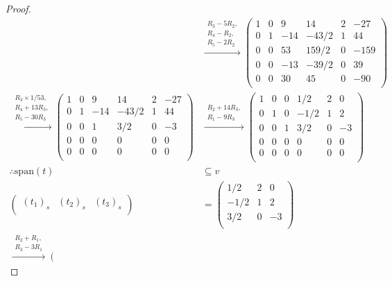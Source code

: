 \documentclass[12pt]{article}
\begin{document}
\begin{proof}
\begin{align*}
&\xrightarrow{\substack{R_3 - 5R_2,\\ R_4 - R_2,\\ R_5 - 2R_2}}
\left( \begin{array}{ccc|c|c|c}
1 & 0 & 9 & 14 & 2 & -27\\ 
0 & 1 & -14 & -43/2 & 1 & 44\\
0 & 0 & 53 & 159/2 & 0 & -159\\ 
0 & 0 & -13 & -39/2 & 0 & 39\\ 
0 & 0 & 30 & 45 & 0 & -90\\ 
\end{array} \right)\\ 
\xrightarrow{\substack{R_3 \times 1/53,\\ R_4 + 13R_3,\\ R_5 - 30R_3}}
\left( \begin{array}{ccc|c|c|c}
1 & 0 & 9 & 14 & 2 & -27\\ 
0 & 1 & -14 & -43/2 & 1 & 44\\
0 & 0 & 1 & 3/2 & 0 & -3\\ 
0 & 0 & 0 & 0 & 0 & 0 \\
0 & 0 & 0 & 0 & 0 & 0 \\
\end{array} \right)
&\xrightarrow{\substack{R_2 + 14R_3,\\ R_1 - 9R_3}}
\left( \begin{array}{ccc|c|c|c}
1 & 0 & 0 & 1/2 & 2 & 0\\ 
0 & 1 & 0 & -1/2 & 1 & 2\\
0 & 0 & 1 & 3/2 & 0 & -3\\ 
0 & 0 & 0 & 0 & 0 & 0 \\
0 & 0 & 0 & 0 & 0 & 0 \\
\end{array} \right)\\
\therefore \text{span}(t) &\subseteq v\\
\left( \begin{array}{ccc}
(t_1)_s & (t_2)_s & (t_3)_s\\
\end{array} \right) &=
\left( \begin{array}{ccc}
1/2 & 2 & 0\\ 
-1/2 & 1 & 2\\
3/2 & 0 & -3\\ 
\end{array} \right)\\
\xrightarrow{\substack{R_2 + R_1,\\ R_3 - 3R_1}} 
\left( \begin{array}{ccc}

\end{array}
\end{align*}
\end{proof}
\end{document}
